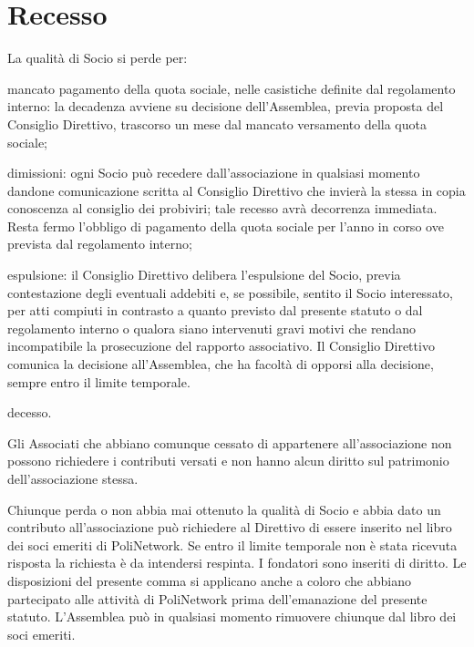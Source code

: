 \documentclass[legalpaper, 11pt]{exam}
\let\tempone\enumerate
\let\temptwo\endenumerate
\renewenvironment{enumerate}{\tempone\addtolength{\itemsep}{-0.45\baselineskip}}{\temptwo}
\begin{document}
{\section{Recesso}
\begin{enumerate}
 \item La qualità di Socio si perde per:
 \vspace{-5pt}
 \begin{enumerate}
  \item mancato pagamento della quota sociale, nelle casistiche definite dal regolamento interno: la decadenza avviene su decisione dell’Assemblea, previa proposta del Consiglio Direttivo, trascorso un mese dal mancato versamento della quota sociale;
  \item dimissioni: ogni Socio può recedere dall’associazione in qualsiasi momento dandone
  comunicazione scritta al Consiglio Direttivo che invierà la stessa in copia conoscenza al consiglio dei probiviri; tale recesso avrà decorrenza immediata. Resta fermo l’obbligo di pagamento della quota sociale per l’anno in corso ove prevista dal regolamento interno;
  \item espulsione: il Consiglio Direttivo delibera l’espulsione del Socio, previa contestazione degli eventuali addebiti e, se possibile, sentito il Socio interessato, per atti compiuti in contrasto a quanto previsto dal presente statuto o dal regolamento interno o qualora siano intervenuti gravi motivi che rendano incompatibile la prosecuzione del rapporto associativo. Il Consiglio Direttivo comunica la decisione all’Assemblea, che ha facoltà di opporsi alla decisione, sempre entro il limite temporale.
  \item decesso.
 \end{enumerate}

 \item Gli Associati che abbiano comunque cessato di appartenere all’associazione non possono richiedere i contributi versati e non hanno alcun diritto sul patrimonio dell’associazione stessa.
 \item Chiunque perda o non abbia mai ottenuto la qualità di Socio e abbia dato un contributo all’associazione può richiedere al Direttivo di essere inserito nel libro dei soci emeriti di PoliNetwork. Se entro il limite temporale non è stata ricevuta risposta la richiesta è da intendersi respinta. I fondatori sono inseriti di diritto. Le disposizioni del presente comma si applicano anche a coloro che abbiano partecipato alle attività di PoliNetwork prima dell’emanazione del presente statuto. L’Assemblea può in qualsiasi momento rimuovere chiunque dal libro dei soci emeriti.
\end{enumerate}

}
\end{document}
